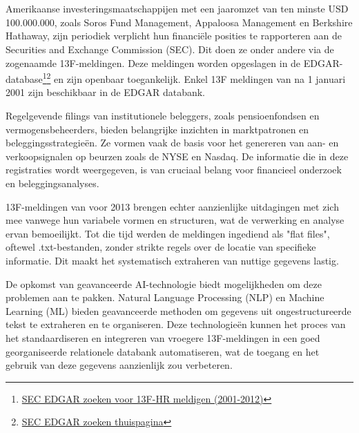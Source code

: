 
\chapter{}%
\label{ch:inleiding}
Amerikaanse investeringsmaatschappijen met een jaaromzet van ten minste USD 100.000.000, zoals Soros Fund Management, Appaloosa Management en Berkshire Hathaway, zijn periodiek verplicht hun financiële posities te rapporteren aan de Securities and Exchange Commission (SEC). Dit doen ze onder andere via de zogenaamde 13F-meldingen. Deze meldingen worden opgeslagen in de EDGAR-database\footnote{\href{https://www.sec.gov/edgar/search/\#/dateRange=custom\&category=custom\&startdt=2001-01-01\&enddt=2012-12-31\&forms=13F-HR}{SEC EDGAR zoeken voor 13F-HR meldigen (2001-2012)}}\footnote{\href{https://www.sec.gov/edgar/search/}{SEC EDGAR zoeken thuispagina}}
 en zijn openbaar toegankelijk. Enkel 13F meldingen van na 1 januari 2001 zijn beschikbaar in de EDGAR databank.


Regelgevende filings van institutionele beleggers, zoals pensioenfondsen en vermogensbeheerders, bieden belangrijke inzichten in marktpatronen en beleggingsstrategieën. Ze vormen vaak de basis voor het genereren van aan- en verkoopsignalen op beurzen zoals de NYSE en Nasdaq. De informatie die in deze registraties wordt weergegeven, is van cruciaal belang voor financieel onderzoek en beleggingsanalyses. 

13F-meldingen van voor 2013 brengen echter aanzienlijke uitdagingen met zich mee vanwege hun variabele vormen en structuren, wat de verwerking en analyse ervan bemoeilijkt. Tot die tijd werden de meldingen ingediend als "flat files", oftewel .txt-bestanden, zonder strikte regels over de locatie van specifieke informatie. Dit maakt het systematisch extraheren van nuttige gegevens lastig.

De opkomst van geavanceerde AI-technologie biedt mogelijkheden om deze problemen aan te pakken. Natural Language Processing (NLP) en Machine Learning (ML) bieden geavanceerde methoden om gegevens uit ongestructureerde tekst te extraheren en te organiseren. Deze technologieën kunnen het proces van het standaardiseren en integreren van vroegere 13F-meldingen in een goed georganiseerde relationele databank automatiseren, wat de toegang en het gebruik van deze gegevens aanzienlijk zou verbeteren.

